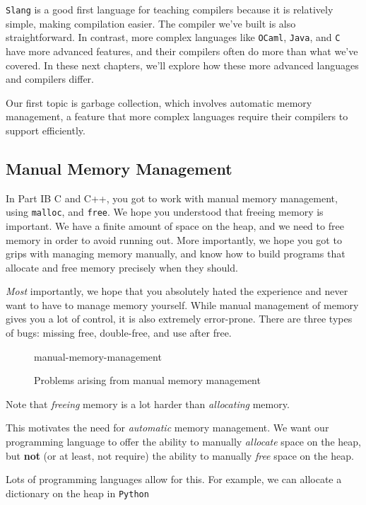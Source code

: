 \texttt{Slang} is a good first language for teaching compilers because it is relatively simple, making compilation easier. The compiler we've built is also straightforward. In contrast, more complex languages like \texttt{OCaml}, \texttt{Java}, and \texttt{C} have more advanced features, and their compilers often do more than what we've covered. In these next chapters, we’ll explore how these more advanced languages and compilers differ.

Our first topic is garbage collection, which involves automatic memory management, a feature that more complex languages require their compilers to support efficiently.

\subsection{Manual Memory Management}
In \textsf{Part IB C and C++}, you got to work with manual memory management, using \texttt{malloc}, and \texttt{free}. We hope you understood that freeing memory is important. We have a finite amount of space on the heap, and we need to free memory in order to avoid running out. More importantly, we hope you got to grips with managing memory manually, and know how to build programs that allocate and free memory precisely when they should. 

\textit{Most} importantly, we hope that you absolutely hated the experience and never want to have to manage memory yourself. While manual management of memory gives you a lot of control, it is also extremely error-prone. There are three types of bugs: missing free, double-free, and use after free.

\begin{figure}[H]
    \centering
    {manual-memory-management}
    \caption{Problems arising from manual memory management}
    \label{fig:manual-memory-management}
\end{figure}

Note that \textit{freeing} memory is a lot harder than \textit{allocating} memory.

This motivates the need for \textit{automatic} memory management. We want our programming language to offer the ability to manually \textit{allocate} space on the heap, but \textbf{not} (or at least, not require) the ability to manually \textit{free} space on the heap.

Lots of programming languages allow for this. For example, we can allocate a dictionary on the heap in \texttt{Python}

